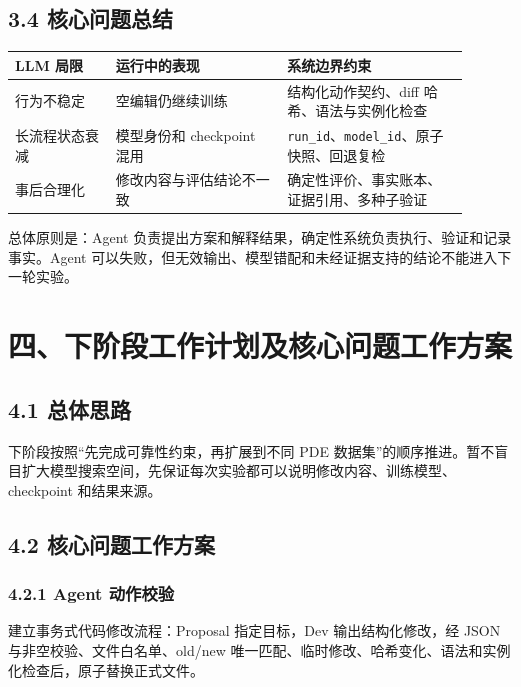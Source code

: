 \documentclass[UTF8,a4paper,zihao=-4]{ctexart}
\begin{document}
\subsection*{3.4 核心问题总结}

\begin{table}[H]
\centering
\begin{tabular}{|>{\raggedright\arraybackslash}p{0.2\linewidth}|>{\raggedright\arraybackslash}p{0.34\linewidth}|>{\raggedright\arraybackslash}p{0.36\linewidth}|}
\hline
\textbf{LLM 局限} & \textbf{运行中的表现} & \textbf{系统边界约束} \\
\hline
行为不稳定 & 空编辑仍继续训练 & 结构化动作契约、diff 哈希、语法与实例化检查 \\
\hline
长流程状态衰减 & 模型身份和 checkpoint 混用 & \texttt{run\_id}、\texttt{model\_id}、原子快照、回退复检 \\
\hline
事后合理化 & 修改内容与评估结论不一致 & 确定性评价、事实账本、证据引用、多种子验证 \\
\hline
\end{tabular}
\end{table}

总体原则是：Agent 负责提出方案和解释结果，确定性系统负责执行、验证和记录事实。Agent 可以失败，但无效输出、模型错配和未经证据支持的结论不能进入下一轮实验。

\section*{四、下阶段工作计划及核心问题工作方案}

\subsection*{4.1 总体思路}

下阶段按照“先完成可靠性约束，再扩展到不同 PDE 数据集”的顺序推进。暂不盲目扩大模型搜索空间，先保证每次实验都可以说明修改内容、训练模型、checkpoint 和结果来源。

\subsection*{4.2 核心问题工作方案}

\subsubsection*{4.2.1 Agent 动作校验}

建立事务式代码修改流程：Proposal 指定目标，Dev 输出结构化修改，经 JSON 与非空校验、文件白名单、old/new 唯一匹配、临时修改、哈希变化、语法和实例化检查后，原子替换正式文件。
\end{document}
